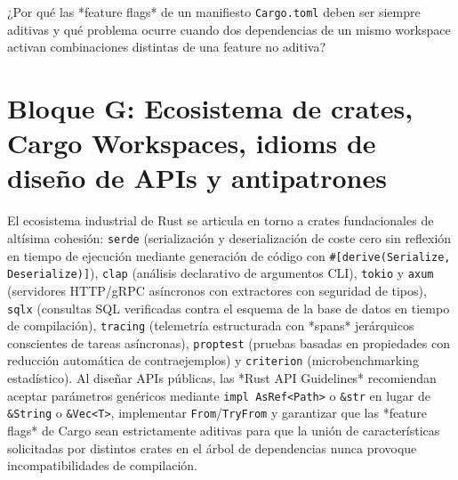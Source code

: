 \documentclass{book}
\begin{document}
\begin{tcolorbox}[title={Autoficha}, studiumcheck, breakable]

¿Por qué las *feature flags* de un manifiesto \texttt{Cargo.toml} deben ser siempre aditivas y qué problema ocurre cuando dos dependencias de un mismo workspace activan combinaciones distintas de una feature no aditiva?
\end{tcolorbox}

\section{Bloque G: Ecosistema de crates, Cargo Workspaces, idioms de diseño de APIs y antipatrones}

El ecosistema industrial de Rust se articula en torno a crates fundacionales de altísima cohesión: \texttt{serde} (serialización y deserialización de coste cero sin reflexión en tiempo de ejecución mediante generación de código con \texttt{\#[derive(Serialize, Deserialize)]}), \texttt{clap} (análisis declarativo de argumentos CLI), \texttt{tokio} y \texttt{axum} (servidores HTTP/gRPC asíncronos con extractores con seguridad de tipos), \texttt{sqlx} (consultas SQL verificadas contra el esquema de la base de datos en tiempo de compilación), \texttt{tracing} (telemetría estructurada con *spans* jerárquicos conscientes de tareas asíncronas), \texttt{proptest} (pruebas basadas en propiedades con reducción automática de contraejemplos) y \texttt{criterion} (microbenchmarking estadístico). Al diseñar APIs públicas, las *Rust API Guidelines* recomiendan aceptar parámetros genéricos mediante \texttt{impl AsRef<Path>} o \texttt{\&str} en lugar de \texttt{\&String} o \texttt{\&Vec<T>}, implementar \texttt{From}/\texttt{TryFrom} y garantizar que las *feature flags* de Cargo sean estrictamente aditivas para que la unión de características solicitadas por distintos crates en el árbol de dependencias nunca provoque incompatibilidades de compilación.
\end{document}
